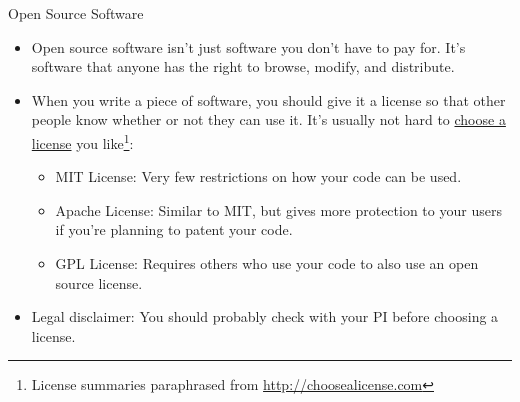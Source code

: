\begin{frame}{Open Source Software}

 \begin{itemize}

  \item Open source software isn't just software you don't have to pay for.  
   It's software that anyone has the right to browse, modify, and distribute. 

  \item When you write a piece of software, you should give it a license so 
   that other people know whether or not they can use it.  It's usually not 
   hard to \href{http://choosealicense.com/}{choose a license} you 
   like\footnote{License summaries paraphrased from 
   \url{http://choosealicense.com}}:

  \begin{itemize}

   \item MIT License: Very few restrictions on how your code can be used.

   \item Apache License: Similar to MIT, but gives more protection to your 
    users if you're planning to patent your code.

   \item GPL License: Requires others who use your code to also use an open 
    source license.

   \end{itemize}
   
  \item Legal disclaimer: You should probably check with your PI before 
   choosing a license.

 \end{itemize}

\end{frame}
